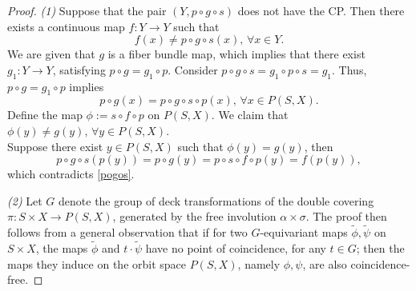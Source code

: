 \documentclass{amsart}
\begin{document}
	\begin{proof} \textit{(1)}
		Suppose that the pair $(Y,p \circ g \circ s)$ does not have the CP. 
		Then there exists a continuous map $f : Y \to Y$ such that \begin{equation} \label{pogos}
			f(x) \neq p \circ g \circ s(x), \, \forall x \in Y.
		\end{equation}
		We are given that $g$ is a fiber bundle map, which implies that there exist  $g_1:Y\to Y$, satisfying  $p \circ g = g_1 \circ p.$
		Consider $p\circ g\circ s=g_1\circ p\circ s=g_1 $.
		Thus, $p \circ g = g_1 \circ p$ implies
		\[
		p \circ g(x) = p \circ g \circ s \circ p(x),\, \forall x \in P(S, X).
		\]
		Define the map $\phi := s \circ f \circ p$ on $P(S, X)$. We claim that $\phi(y)\neq g(y), \, \forall y \in P(S,X)$. \\ Suppose there exist $y \in P(S, X)$ such that $\phi(y) = g(y)$, then 
		\[
		p \circ g \circ s(p(y)) = p \circ g(y)
		= p \circ s \circ f \circ p (y) 
		= f(p(y)),
		\]
		which contradicts \eqref{pogos}.
		
		
		\textit{(2)} %
		Let $G$ denote the group of deck transformations of the double covering $\pi : S \times X \to P(S, X)$, generated by the free involution $\alpha \times \sigma.$
		The proof then follows from a general observation that if for two $G$-equivariant maps $\tilde\phi, \tilde\psi$ on $S\times X$, the maps $\tilde \phi$ and $t \cdot \tilde\psi$ have no point of coincidence, for any $t \in G$; then the maps they induce on the orbit space $P(S,X)$, namely $\phi, \psi$, are also coincidence-free.
	\end{proof}
	
\end{document}
